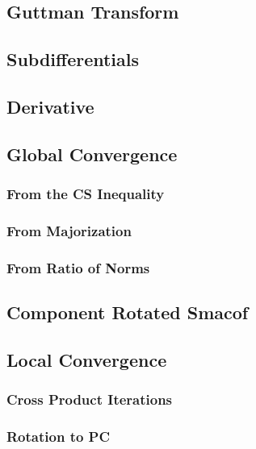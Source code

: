 \documentclass[
  12pt,
]{book}
\begin{document}
\subsection{Guttman Transform}\label{propguttman}

\subsection{Subdifferentials}\label{subdifferentials}

\subsection{Derivative}\label{derivative}

\subsection{Global Convergence}\label{global-convergence}

\subsubsection{From the CS Inequality}\label{from-the-cs-inequality}

\subsubsection{From Majorization}\label{from-majorization}

\subsubsection{From Ratio of Norms}\label{from-ratio-of-norms}

\subsection{Component Rotated Smacof}\label{mincomprot}

\subsection{Local Convergence}\label{minlocconv}

\subsubsection{Cross Product Iterations}\label{cross-product-iterations}

\subsubsection{Rotation to PC}\label{rotation-to-pc}
\end{document}

